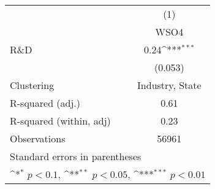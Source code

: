{
\def\sym#1{\ifmmode^{#1}\else\(^{#1}\)\fi}
\begin{tabular}{l*{1}{c}}
\toprule
                    &\multicolumn{1}{c}{(1)}\\
                    &\multicolumn{1}{c}{WSO4}\\
\midrule
R\&D                &        0.24\sym{***}\\
                    &     (0.053)         \\
\midrule
Clustering          & Industry, State        \\
R-squared (adj.)    &        0.61         \\
R-squared (within, adj)&        0.23         \\
Observations        &       56961         \\
\bottomrule
\multicolumn{2}{l}{\tiny Standard errors in parentheses}\\
\multicolumn{2}{l}{\tiny \sym{*} \(p<0.1\), \sym{**} \(p<0.05\), \sym{***} \(p<0.01\)}\\
\end{tabular}
}
